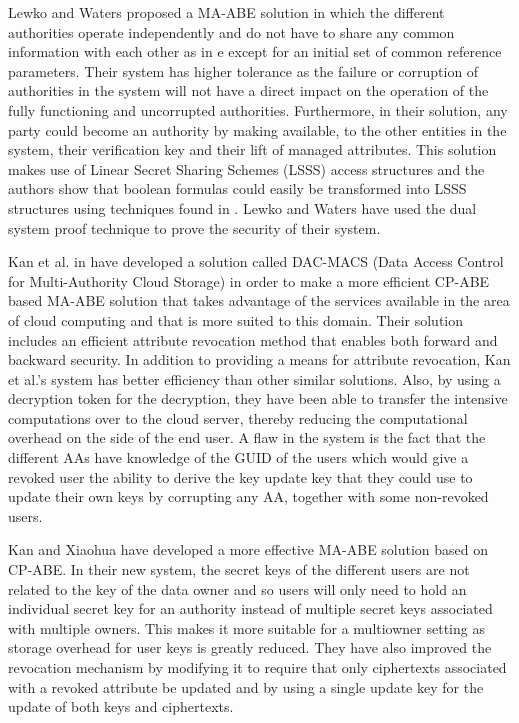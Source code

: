 Lewko and Waters proposed a MA-ABE\cite{Lewko2011a}\cite{Lewko2011b} solution in which the different authorities operate independently and do not have to share any common information with each other as in \cite{Chase2007} e except for an initial set of common reference parameters. Their system has higher tolerance as the failure or corruption of authorities in the system will not have a direct impact on the operation of the fully functioning and uncorrupted authorities. Furthermore, in their solution, any party could become an authority by making available, to the other entities in the system, their verification key and their lift of managed attributes. This solution makes use of Linear Secret Sharing Schemes (LSSS) access structures and the authors show that boolean formulas could easily be transformed into LSSS structures using techniques found in \cite{Lewko2011b}. Lewko and Waters have used the dual system proof technique to prove the security of their system.

Kan et al. in \cite{Yang2013} have developed a solution called DAC-MACS (Data Access Control for Multi-Authority Cloud Storage) in order to make a more efficient CP-ABE based MA-ABE solution that takes advantage of the services available in the area of cloud computing and that is more suited to this domain. Their solution includes an efficient attribute revocation method that enables both forward and backward security. In addition to providing a means for attribute revocation, Kan et al.'s system\cite{Yang2013} has better efficiency than other similar solutions. Also, by using a decryption token for the decryption, they have been able to transfer the intensive computations over to the cloud server, thereby reducing the computational overhead on the side of the end user. A flaw in the system is the fact that the different AAs have knowledge of the GUID of the users which would give a revoked user the ability to derive the key update key that they could use to update their own keys by corrupting any AA, together with some non-revoked users.

Kan and Xiaohua\cite{Yang2014} have developed a more effective MA-ABE solution based on CP-ABE. In their new system, the secret keys of the different users are not related to the key of the data owner and so users will only need to hold an individual secret key for an authority instead of multiple secret keys associated with multiple owners. This makes it more suitable for a multiowner setting as storage overhead for user keys is greatly reduced. They have also improved the revocation mechanism by modifying it to require that only ciphertexts associated with a revoked attribute be updated and by using a single update key for the update of both keys and ciphertexts.


